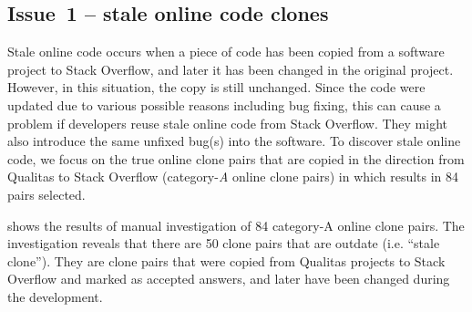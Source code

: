 \documentclass{sig-alternate-05-2015}
\begin{document}
\subsection{Issue~1 -- stale online code clones}
Stale online code occurs when a piece of code has been copied from a software project to Stack Overflow, and later it has been changed in the original project. However, in this situation, the copy is still unchanged. Since the code were updated due to various possible reasons including bug fixing, this can cause a problem if developers reuse stale online code from Stack Overflow. They might also introduce the same unfixed bug(s) into the software. To discover stale online code, we focus on the true online clone pairs that are copied in the direction from Qualitas to Stack Overflow (category-\textit{A} online clone pairs) in  which results in 84 pairs selected. %



 shows the results of manual investigation of 84 category-A online clone pairs. The investigation reveals that there are 50 clone pairs that are outdate (i.e. ``stale clone''). They are clone pairs that were copied from Qualitas projects to Stack Overflow and marked as accepted answers, and later have been changed during the development.  
\end{document}

